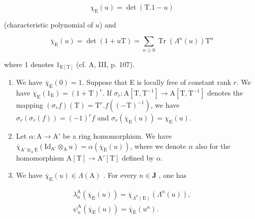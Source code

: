 \[
\chi_ {\mathrm{E}} (u) = \det (\mathrm{T}. 1 - u)
\]

(characteristic polynomial of \(u\)) and

\[
\overline {{{{\chi}}}} _ {\mathrm{E}} (u) = \det (1 + u \mathrm{T}) = \sum_ {n \geqslant 0} \operatorname{Tr} \left(\Lambda ^ {n} (u)\right) \mathrm{T} ^ {n}
\]

where 1 denotes \(1_{\mathrm{E[T]}}\) (cf. A, III, p. 107).

\begin{enumerate}
\def\labelenumi{\alph{enumi})}
\setcounter{enumi}{2}
\item
  We have \(\overline{\chi}_{\mathrm{E}}(0) = 1\). Suppose that E is locally free of constant rank \(r\). We have \(\overline{\chi}_{\mathrm{E}}(1_{\mathrm{E}}) = (1 + \mathrm{T})^{r}\). If \(\sigma_r: \mathrm{A}[\mathrm{T}, \mathrm{T}^{-1}] \to \mathrm{A}[\mathrm{T}, \mathrm{T}^{-1}]\) denotes the mapping \((\sigma_r f)(\mathrm{T}) = \mathrm{T}^r. f((- \mathrm{T})^{-1})\), we have \(\sigma_r(\sigma_r(f)) = (-1)^r f\) and \(\sigma_r(\overline{\chi}_{\mathrm{E}}(u)) = \chi_{\mathrm{E}}(u)\).
\item
  Let \(\alpha: \mathrm{A} \to \mathrm{A}'\) be a ring homomorphism. We have \(\overline{\chi}_{\mathrm{A}'\otimes_{\mathrm{A}}\mathrm{E}}(\mathrm{Id}_{\mathrm{A}'} \otimes_{\mathrm{A}} u) = \alpha(\overline{\chi}_{\mathrm{E}}(u))\), where we denote \(\alpha\) also for the homomorphism \(\mathrm{A}[\mathrm{T}] \to \mathrm{A}'[\mathrm{T}]\) defined by \(\alpha\).
\item
  We have \(\overline{\chi}_{\mathrm{E}}(u) \in \Lambda(\mathrm{A})\) . For every \(n \in \mathbf{J}\) , one has
\end{enumerate}

\[
\begin{array}{l} \lambda_ {n} ^ {\mathrm{A}} (\overline {{\chi}} _ {\mathrm{E}} (u)) = \overline {{\chi}} _ {\Lambda^ {n} (\mathrm{E})} (\Lambda^ {n} (u)), \\ \psi_ {n} ^ {\mathrm{A}} (\overline {{\chi}} _ {\mathrm{E}} (u)) = \overline {{\chi}} _ {\mathrm{E}} (u ^ {n}). \end{array}
\]

